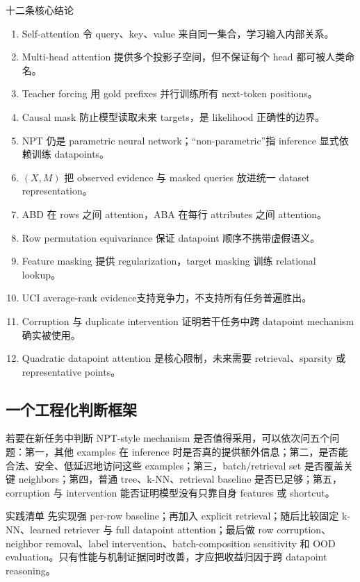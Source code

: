 \documentclass[a4paper]{article}
\begin{document}
\begin{importantbox}{十二条核心结论}
\begin{enumerate}
  \item Self-attention 令 query、key、value 来自同一集合，学习输入内部关系。
  \item Multi-head attention 提供多个投影子空间，但不保证每个 head 都可被人类命名。
  \item Teacher forcing 用 gold prefixes 并行训练所有 next-token positions。
  \item Causal mask 防止模型读取未来 targets，是 likelihood 正确性的边界。
  \item NPT 仍是 parametric neural network；“non-parametric”指 inference 显式依赖训练 datapoints。
  \item $(X,M)$ 把 observed evidence 与 masked queries 放进统一 dataset representation。
  \item ABD 在 rows 之间 attention，ABA 在每行 attributes 之间 attention。
  \item Row permutation equivariance 保证 datapoint 顺序不携带虚假语义。
  \item Feature masking 提供 regularization，target masking 训练 relational lookup。
  \item UCI average-rank evidence支持竞争力，不支持所有任务普遍胜出。
  \item Corruption 与 duplicate intervention 证明若干任务中跨 datapoint mechanism 确实被使用。
  \item Quadratic datapoint attention 是核心限制，未来需要 retrieval、sparsity 或 representative points。
\end{enumerate}
\end{importantbox}

\subsection{一个工程化判断框架}

若要在新任务中判断 NPT-style mechanism 是否值得采用，可以依次问五个问题：第一，其他 examples 在 inference 时是否真的提供额外信息；第二，是否能合法、安全、低延迟地访问这些 examples；第三，batch/retrieval set 是否覆盖关键 neighbors；第四，普通 tree、k-NN、retrieval baseline 是否已足够；第五，corruption 与 intervention 能否证明模型没有只靠自身 features 或 shortcut。

\begin{knowledgebox}{实践清单}
先实现强 per-row baseline；再加入 explicit retrieval；随后比较固定 k-NN、learned retriever 与 full datapoint attention；最后做 row corruption、neighbor removal、label intervention、batch-composition sensitivity 和 OOD evaluation。只有性能与机制证据同时改善，才应把收益归因于跨 datapoint reasoning。
\end{knowledgebox}
\end{document}
